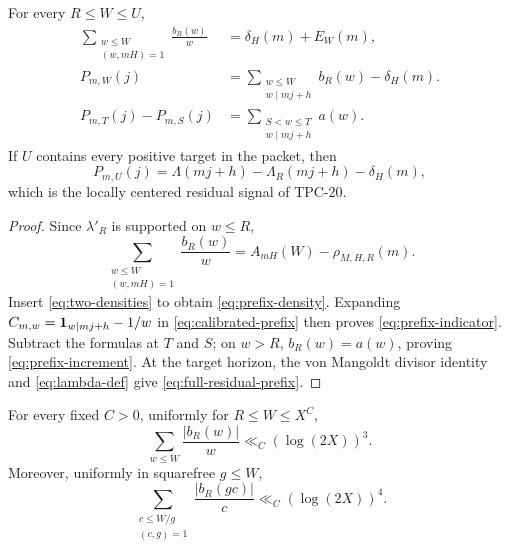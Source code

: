 \begin{proposition}
\label{prop:prefix-identities}
For every \(R\le W\le U\),
\begin{align}
 \sum_{\substack{w\le W\\(w,mH)=1}}\frac{b_R(w)}w
 &=\delta_H(m)+E_W(m),
 \label{eq:prefix-density}\\
 P_{m,W}(j)
 &=
 \sum_{\substack{w\le W\\w\mid mj+h}}b_R(w)-\delta_H(m).
 \label{eq:prefix-indicator}\\
 P_{m,T}(j)-P_{m,S}(j)
 &=
 \sum_{\substack{S<w\le T\\w\mid mj+h}}a(w).
 \label{eq:prefix-increment}
\end{align}
If \(U\) contains every positive target in the packet, then
\begin{equation}
 P_{m,U}(j)=
 \Lambda(mj+h)-\Lambda_R(mj+h)-\delta_H(m),
 \label{eq:full-residual-prefix}
\end{equation}
which is the locally centered residual signal of TPC-20.
\end{proposition}

\begin{proof}
Since \(\lambda'_R\) is supported on \(w\le R\),
\[
 \sum_{\substack{w\le W\\(w,mH)=1}}\frac{b_R(w)}w
 =A_{mH}(W)-\rho_{M,H,R}(m).
\]
Insert \eqref{eq:two-densities} to obtain
\eqref{eq:prefix-density}.  Expanding
\(C_{m,w}=\mathbf 1_{w\mid mj+h}-1/w\) in
\eqref{eq:calibrated-prefix} then proves
\eqref{eq:prefix-indicator}.  Subtract the formulas at \(T\) and
\(S\); on \(w>R\), \(b_R(w)=a(w)\), proving
\eqref{eq:prefix-increment}.  At the target horizon, the von Mangoldt
divisor identity and \eqref{eq:lambda-def} give
\eqref{eq:full-residual-prefix}.
\end{proof}

\begin{lemma}
\label{lem:prefix-mass}
For every fixed \(C>0\), uniformly for \(R\le W\le X^C\),
\begin{equation}
 \sum_{w\le W}\frac{|b_R(w)|}{w}\ll_C(\log(2X))^3.
 \label{eq:prefix-L1}
\end{equation}
Moreover, uniformly in squarefree \(g\le W\),
\begin{equation}
 \sum_{\substack{c\le W/g\\(c,g)=1}}
 \frac{|b_R(gc)|}{c}\ll_C(\log(2X))^4.
 \label{eq:cofactor-L1}
\end{equation}
\end{lemma}

